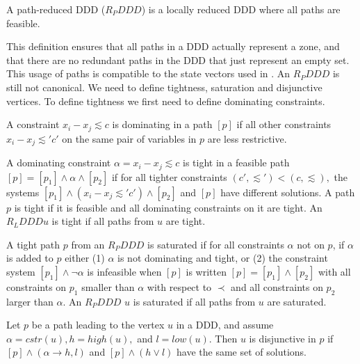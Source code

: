 \begin{mydef}
A path-reduced DDD ($R_PDDD$) is a locally reduced DDD where all paths are feasible.
\end{mydef}

This definition ensures that all paths in a DDD actually represent a zone, and that there are no redundant paths in the DDD that just represent an empty set. This usage of paths is compatible to the state vectors used in \ltsmin{}. An $R_PDDD$ is still not canonical. We need to define tightness, saturation and disjunctive vertices. To define tightness we first need to define dominating constraints.

\begin{mydef}
A constraint $x_i - x_j \lesssim c$ is dominating in a path $[p]$ if all other constraints $x_i - x_j \lesssim' c'$ on the same pair of variables in $p$ are less restrictive.
\end{mydef}

\begin{mydef}
A dominating constraint $\alpha = x_i - x_j \lesssim c$ is tight in a feasible path $[p] = [p_1] \wedge \alpha \wedge [p_2]$ if for all tighter constraints $(c', \lesssim') < (c,\lesssim),$ the systems $[p_1] \wedge (x_i - x_j \lesssim' c') \wedge [p_2]$ and $[p]$ have different solutions. A path $p$ is tight if it is feasible and all dominating constraints on it are tight. An $R_LDDD u$ is tight if all paths from $u$ are tight. 
\end{mydef}

\begin{mydef}
A tight path $p$ from an $R_PDDD$ is saturated if for all constraints $\alpha$ not on $p$, if $\alpha$ is added to $p$ either (1) $\alpha$ is not dominating and tight, or (2) the constraint system $[p_1] \wedge \neg\alpha$ is infeasible when $[p]$ is written $[p] = [p_1] \wedge [p_2]$ with all constraints on $p_1$ smaller than $\alpha$ with respect to $\prec$ and all constraints on $p_2$ larger than $\alpha$. An $R_PDDD$ $u$ is saturated if all paths from $u$ are saturated.
\end{mydef}

\begin{mydef}
Let $p$ be a path leading to the vertex $u$ in a DDD, and assume $\alpha = cstr(u), h = high(u),$ and $l = low(u)$. Then $u$ is disjunctive in $p$ if $[p] \wedge (\alpha \rightarrow h,l)$ and $[p] \wedge (h \vee l)$ have the same set of solutions.
\end{mydef}

